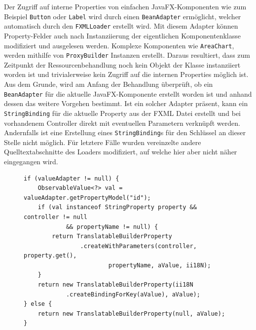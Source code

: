 \noindent Der Zugriff auf interne Properties von einfachen JavaFX-Komponenten wie zum Beispiel \texttt{Button} oder \texttt{Label} wird durch einen \texttt{BeanAdapter} ermöglicht, welcher automatisch durch den \texttt{FXMLLoader} erstellt wird. Mit diesem Adapter können Property-Felder auch nach Instanziierung der eigentlichen Komponentenklasse modifiziert und ausgelesen werden. Komplexe Komponenten wie \texttt{AreaChart}, werden mithilfe von \texttt{ProxyBuilder} Instanzen erstellt. Daraus resultiert, dass zum Zeitpunkt der Ressourcenbehandlung noch kein Objekt der Klasse instanziiert worden ist und trivialerweise kein Zugriff auf die internen Properties möglich ist. Aus dem Grunde, wird am Anfang der Behandlung überprüft, ob ein \texttt{BeanAdapter} für die aktuelle JavaFX-Komponente erstellt worden ist und anhand dessen das weitere Vorgehen bestimmt. Ist ein solcher Adapter präsent, kann ein \texttt{StringBinding} für die aktuelle Property aus der FXML Datei erstellt und bei vorhandenem Controller direkt mit eventuellen Parametern verknüpft werden. Andernfalls ist eine Erstellung eines \texttt{StringBinding}s für den Schlüssel an dieser Stelle nicht möglich. Für letztere Fälle wurden vereinzelte andere Quelltextabschnitte des Loaders modifiziert, auf welche hier aber nicht näher eingegangen wird.
\begin{figure}[H]
	\centering
	\begin{lstlisting}[caption=Implementierung -- Ressourcenbehandlung im \texttt{SimpliFXMLLoader}., captionpos=b, label=lst:resource_handling]
if (valueAdapter != null) {
	ObservableValue<?> val = valueAdapter.getPropertyModel("id");
	if (val instanceof StringProperty property && controller != null 
			&& propertyName != null) {
		return TranslatableBuilderProperty
				.createWithParameters(controller, property.get(), 
						propertyName, aValue, ii18N);
	}
	return new TranslatableBuilderProperty(ii18N
			.createBindingForKey(aValue), aValue);
} else {
	return new TranslatableBuilderProperty(null, aValue);
}
	\end{lstlisting}
\end{figure}
